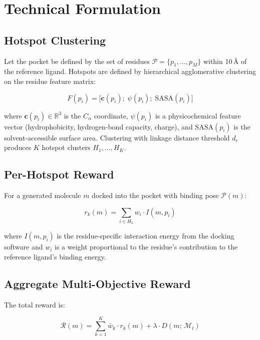 \documentclass[10pt,twocolumn]{article}
\begin{document}
\section{Technical Formulation}

\subsection*{Hotspot Clustering}

Let the pocket be defined by the set of residues $\mathcal{P} = \{p_1, \ldots, p_M\}$ within 10\,\AA{} of the reference ligand.
Hotspots are defined by hierarchical agglomerative clustering on the residue feature matrix:

\begin{equation}
F(p_i) = \bigl[\mathbf{c}(p_i);\; \psi(p_i);\; \mathrm{SASA}(p_i)\bigr]
\end{equation}

where $\mathbf{c}(p_i) \in \mathbb{R}^3$ is the $C_\alpha$ coordinate, $\psi(p_i)$ is a physicochemical feature vector (hydrophobicity, hydrogen-bond capacity, charge), and $\mathrm{SASA}(p_i)$ is the solvent-accessible surface area.
Clustering with linkage distance threshold $d_c$ produces $K$ hotspot clusters $H_1, \ldots, H_K$.

\subsection*{Per-Hotspot Reward}

For a generated molecule $m$ docked into the pocket with binding pose $\mathcal{P}(m)$:

\begin{equation}
r_k(m) = \sum_{i \in H_k} w_i \cdot I(m, p_i)
\end{equation}

where $I(m,p_i)$ is the residue-specific interaction energy from the docking software and $w_i$ is a weight proportional to the residue's contribution to the reference ligand's binding energy.

\subsection*{Aggregate Multi-Objective Reward}

The total reward is:

\begin{equation}
\mathcal{R}(m) = \sum_{k=1}^K \bar{w}_k \cdot r_k(m) + \lambda \cdot D(m;\, \mathcal{M}_{t})
\label{eq:reward}
\end{equation}
\end{document}
